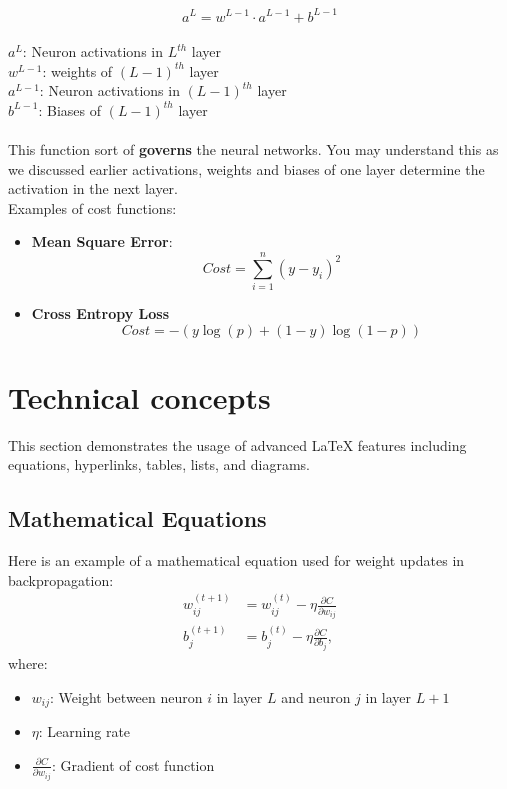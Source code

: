 \documentclass[twoside]{article}
\begin{document}
\[ a^L = w^{L-1} \cdot a^{L-1} + b^{L-1} \]
\\
\(a^L\): Neuron activations in \(L^{th}\) layer\\
\(w^{L-1}\): weights of \((L-1)^{th}\) layer\\
\(a^{L-1}\): Neuron activations in \((L-1)^{th}\) layer\\
\(b^{L-1}\): Biases of  \((L-1)^{th}\) layer\\
\\
This function sort of \textbf{governs} the neural networks. You may understand this as we discussed earlier activations, weights and biases of one layer determine the activation in the next layer.
\\
Examples of cost functions:
\begin{itemize}
    \item \textbf{Mean Square Error}: 
    \[Cost = \sum_{i=1}^{n} (y - y_i)^2\]
    \item \textbf{Cross Entropy Loss}
    \[Cost = -{(y\log(p) + (1 - y)\log(1 - p))}\]
\end{itemize}



\section{Technical concepts}

This section demonstrates the usage of advanced LaTeX features including equations, hyperlinks, tables, lists, and diagrams.

\subsection{Mathematical Equations}
Here is an example of a mathematical equation used for weight updates in backpropagation:
\begin{align}
    w_{ij}^{(t+1)} &= w_{ij}^{(t)} - \eta \frac{\partial C}{\partial w_{ij}} \\
    b_j^{(t+1)} &= b_j^{(t)} - \eta \frac{\partial C}{\partial b_j},
\end{align}
where:
\begin{itemize}
    \item \( w_{ij} \): Weight between neuron \(i\) in layer \(L\) and neuron \(j\) in layer \(L+1\)
    \item \( \eta \): Learning rate
    \item \( \frac{\partial C}{\partial w_{ij}} \): Gradient of cost function
\end{itemize}
\end{document}
